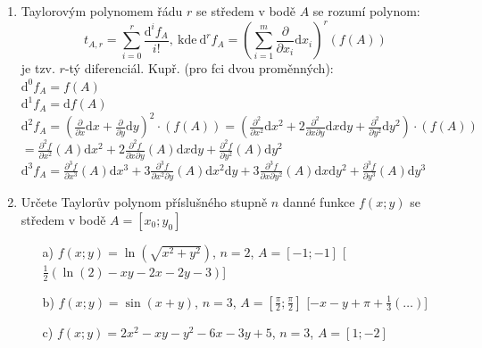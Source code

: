 \begin{enumerate}
\item Taylorovým polynomem řádu $r$ se středem v bodě $A$ se rozumí polynom:
$$
t_{A,r} = \sum_{i=0}^r \frac{\mathrm{d}^i f_A}{i!}
\mathrm{, ~ kde ~ }
\mathrm{d}^r f_A = \left( \sum_{i=1}^m \frac{\partial}{\partial x_i} \mathrm{d}x_i \right)^r (f(A))
$$
je tzv. $r$-tý diferenciál. Kupř. (pro fci dvou proměnných):
\\$\mathrm{d}^0 f_A = f(A)$
\\$\mathrm{d}^1 f_A = \mathrm{d} f(A)$
\\$\mathrm{d}^2 f_A = (\frac{\partial}{\partial x} \mathrm{d}x
                     + \frac{\partial}{\partial y} \mathrm{d}y)^2
                     \cdot(f(A))
                    = (\frac{\partial^2}{\partial x^2} \mathrm{d}x^2
                     +2\frac{\partial^2}{\partial x \partial y} 
                       \mathrm{d}x \mathrm{d}y
                     + \frac{\partial^2}{\partial y^2} \mathrm{d}y^2)
                     \cdot(f(A))
                     $
\\$                 = \frac{\partial^2 f}{\partial x^2} (A) \mathrm{d}x^2
                    +2\frac{\partial^2 f}{\partial x \partial y} (A)
                        \mathrm{d}x \mathrm{d}y
                    + \frac{\partial^2 f}{\partial y^2} (A) \mathrm{d}y^2
                     $
\\$\mathrm{d}^3 f_A = \frac{\partial^3 f}{\partial x^3} (A) \mathrm{d}x^3
                    +3\frac{\partial^3 f}{\partial x^2 \partial y} (A)
                        \mathrm{d}x^2  \mathrm{d}y
                    +3\frac{\partial^3 f}{\partial x \partial y^2} (A)
                        \mathrm{d}x \mathrm{d}y^2     
                    + \frac{\partial^3 f}{\partial y^3} (A) \mathrm{d}y^3
                     $
                     
                     
                     
\item Určete Taylorův polynom příslušného stupně $n$ danné funkce $f(x;y)$ se středem v bodě $A=[x_0;y_0]$
\begin{enumerate}
\item[a)]{$f(x;y)=\ln(\sqrt{x^2+y^2})$}, $n=2$, $A=[-1;-1]$
\hspace{\fill}[$\frac{1}{2}(\ln(2) -xy-2x-2y-3)$]
\item[b)]{$f(x;y)=\sin(x+y)$}, $n=3$, $A=[\frac{\pi}{2};\frac{\pi}{2}]$
\hspace{\fill}[$-x-y+\pi+\frac{1}{3}(\ldots)$]
\item[c)]{$f(x;y)=2x^2-xy-y^2-6x-3y+5$}, $n=3$, $A=[1;-2]$
\end{enumerate}


\end{enumerate}

